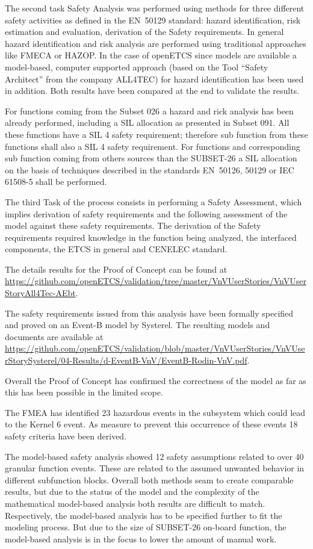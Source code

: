 \documentclass{template/openetcs_report}
\begin{document}
 
The second task Safety Analysis was performed using methods for three different safety activities as defined in the EN~50129 standard: hazard identification,
risk estimation and evaluation, derivation of the Safety requirements. In general hazard identification and risk analysis are performed using traditional approaches like FMECA or HAZOP. In the case of openETCS since models are available a model-based, computer supported approach (based on the Tool “Safety Architect” from the company ALL4TEC) for hazard identification has been used in addition.
Both results have been compared at the end to validate the results.
 
For functions coming from the Subset 026 a hazard and rick analysis has been already performed, including a SIL allocation as presented in Subset 091. All these functions have a SIL 4 safety requirement; therefore sub function from these functions shall also a SIL 4 safety requirement. For functions and corresponding sub function coming from others sources than the SUBSET-26 a SIL allocation on the basis of techniques described in the standards EN~50126, 50129 or IEC 61508-5 shall be performed.
 
The third Task of the process consists in performing a Safety Assessment, which implies derivation of safety requirements and the following assessment of the model against these safety requirements. The derivation of the Safety requirements required knowledge in the function being analyzed, the interfaced components, the ETCS in general and CENELEC standard.
  
The details results for the Proof of Concept can be found at \url{https://github.com/openETCS/validation/tree/master/VnVUserStories/VnVUserStoryAll4Tec-AEbt}. 

The safety requirements issued from this analysis have been formally specified and proved on an Event-B model by Systerel. The resulting models and documents are available at \url{https://github.com/openETCS/validation/blob/master/VnVUserStories/VnVUserStorySysterel/04-Results/d-EventB-VnV/EventB-Rodin-VnV.pdf}.

Overall the Proof of Concept has confirmed the correctness of the model as far as this has been possible in the limited scope. 

The FMEA has identified 23 hazardous events in the subsystem which could lead to the Kernel 6 event. As measure to prevent this occurrence of these events 18 safety criteria have been derived.  

The model-based safety analysis showed 12 safety assumptions related to over 40 granular function events. These are related to the assumed unwanted behavior in different subfunction blocks. Overall both methods seam to create comparable results, but due to the status of the model and the complexity of the mathematical model-based analysis both results are difficult to match. Respectively, the model-based analysis has to be specified further to fit the modeling process. But due to the size of SUBSET-26 on-board function, the model-based analysis is in the focus to lower the amount of manual work.
 
\end{document}
